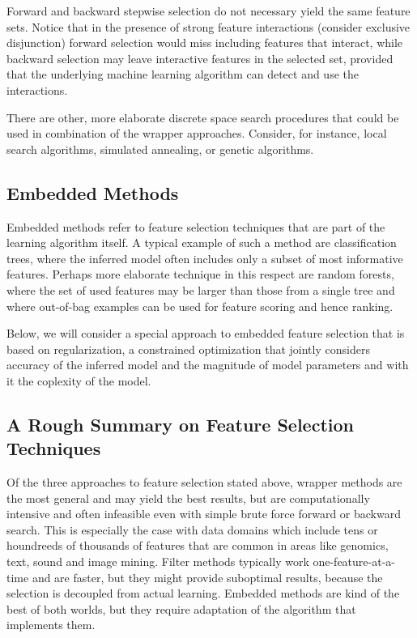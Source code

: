 \begin{refsection}
Forward and backward stepwise selection do not necessary yield the same feature sets. Notice that in the presence of strong feature interactions (\eg consider exclusive disjunction) forward selection would miss including features that interact, while backward selection may leave interactive features in the selected set, provided that the underlying machine learning algorithm can detect and use the interactions.

There are other, more elaborate discrete space search procedures that could be used in combination of the wrapper approaches. Consider, for instance, local search algorithms, simulated annealing, or genetic algorithms.

\subsection*{Embedded Methods}

Embedded methods refer to feature selection techniques that are part of the learning algorithm itself. A typical example of such a method are classification trees, where the inferred model often includes only a subset of most informative features. Perhaps more elaborate technique in this respect are random forests, where the set of used features may be larger than those from a single tree and where out-of-bag examples can be used for feature scoring and hence ranking. 

Below, we will consider a special approach to embedded feature selection that is based on regularization, a constrained optimization that jointly considers accuracy of the inferred model and the magnitude of model parameters and with it the coplexity of the model.

\subsection*{A Rough Summary on Feature Selection Techniques}

Of the three approaches to feature selection stated above, wrapper methods are the most general and may yield the best results, but are computationally intensive and often infeasible even with simple brute force forward or backward search. This is especially the case with data domains which include tens or houndreeds of thousands of features that are common in areas like genomics, text, sound and image mining. Filter methods typically work one-feature-at-a-time and are faster, but they might provide suboptimal results, because the selection is decoupled from actual learning. Embedded methods are kind of the best of both worlds, but they require adaptation of the algorithm that implements them.


\end{refsection}
